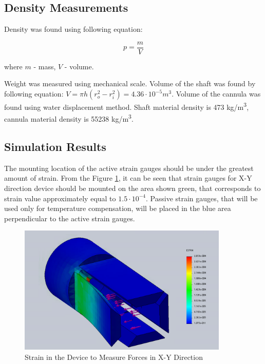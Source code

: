 	\subsection{Density Measurements}
	\label{sec:DenMeas}
Density was found using following equation:

\begin{equation}
p=\frac{m}{V}
\end{equation}

where $m$ - mass, $V$ - volume.

Weight was measured using mechanical scale. Volume of the shaft was found by following equation: $V =  \pi h(r_o^2-r_i^2) = 4.36 \cdot 10^{-5} m^3$. Volume of the cannula was found using water displacement method. Shaft material density is 473 kg/m\textsuperscript{3}, cannula material density is 55238 kg/m\textsuperscript{3}.

\subsection{Simulation Results}
\label{sec:FEAres}
The mounting location of the active strain gauges should be under the greatest amount of strain. From the Figure \ref{fig:XYdev}, it can be seen that strain gauges for X-Y direction device should be mounted on the area shown green, that corresponds to strain value approximately equal to $1.5 \cdot 10^{-4}$. Passive strain gauges, that will be used only for temperature compensation, will be placed in the blue area perpendicular to the active strain gauges.

\begin{figure}[h]
	\begin{center}
		\includegraphics[width=100mm]{fig/methods/old_sleeve.png}
	\end{center}
	\vspace{-4mm}
	\caption[Strain in the Device to Measure Forces in X-Y Direction]
	{Strain in the Device to Measure Forces in X-Y Direction}
	\label{fig:XYdev}
	\vspace{-2mm}
\end{figure}


